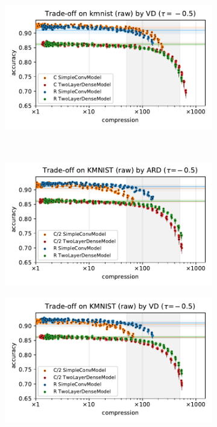 \documentclass[a4paper,10pt,onecolumn]{article}
\begin{document}
\begin{figure}[b]
\begin{subfigure}[b]{0.5\columnwidth}
  \end{subfigure}%
  \begin{subfigure}[b]{0.5\columnwidth}
    \centering
    \includegraphics[width=\columnwidth]{figure__mnist-like__trade-off/appendix__VD__kmnist__raw__-0.5.pdf}
  \end{subfigure} \\ %
  \begin{subfigure}[b]{0.5\columnwidth}
    \centering
    \includegraphics[width=\columnwidth]{figure__mnist-like__trade-off/appendix__cmp__ARD__kmnist__raw__-0.5.pdf}
  \end{subfigure}%
  \begin{subfigure}[b]{0.5\columnwidth}
    \centering
    \includegraphics[width=\columnwidth]{figure__mnist-like__trade-off/appendix__cmp__VD__kmnist__raw__-0.5.pdf}

\end{subfigure}
\end{figure}
\end{document}
